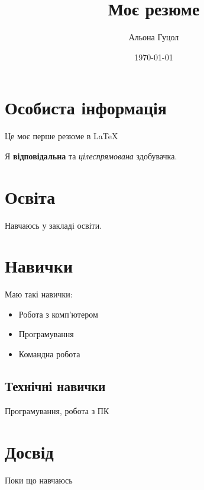 \documentclass[12pt]{article}
\title{Моє резюме}
\author{Альона Гуцол}
\date{\today}
\begin{document}
\maketitle
\tableofcontents

\section{Особиста інформація}

\begin{center}
Це моє перше резюме в LaTeX
\end{center}

Я \textbf{відповідальна} та \textit{цілеспрямована} здобувачка.

\section{Освіта}
Навчаюсь у закладі освіти.

\section{Навички}
Маю такі навички:

\begin{itemize}
\item Робота з комп’ютером
\item Програмування
\item Командна робота
\end{itemize}

\subsection{Технічні навички}
Програмування, робота з ПК

\section{Досвід}
Поки що навчаюсь
\end{document}
